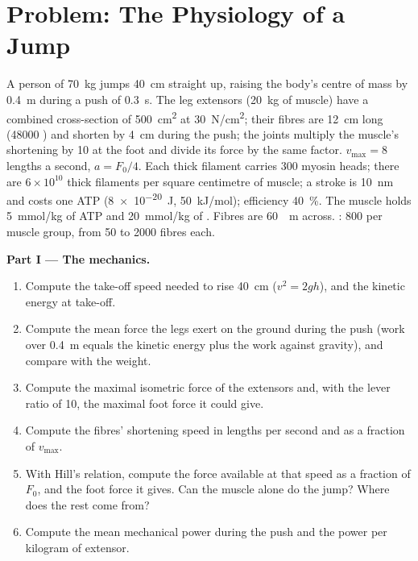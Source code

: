 \section{Problem: The Physiology of a Jump}

\begin{problem}
\label{pb:b2:muscle-movement:1}
A person of \qty{70}{kg} jumps \qty{40}{cm} straight up, raising the
body's centre of mass by \qty{0.4}{m} during a push of \qty{0.3}{s}.
The leg extensors (\qty{20}{kg} of muscle) have a combined
cross-section of \qty{500}{cm^2} at \qty{30}{N/cm^2}; their fibres
are \qty{12}{cm} long (\num{48000} ) and shorten by
\qty{4}{cm} during the push; the joints multiply the muscle's
shortening by \num{10} at the foot and divide its force by the
same factor. $v_{\max} = 8$ lengths a second, $a = F_0/4$. Each
thick filament carries \num{300} myosin heads; there are $6\times
10^{10}$ thick filaments per square centimetre of muscle; a stroke
is \qty{10}{nm} and costs one ATP (\qty{8e-20}{J}, \qty{50}{kJ/mol});
efficiency \qty{40}{\%}. The muscle holds \qty{5}{mmol/kg} of ATP and
\qty{20}{mmol/kg} of . Fibres are \qty{60}{\micro
m} across. : \num{800} per muscle group, from \num{50} to
\num{2000} fibres each.

\medskip
\noindent\textbf{Part I --- The mechanics.}
\begin{enumerate}
  \item Compute the take-off speed needed to rise \qty{40}{cm}
        ($v^{2} = 2gh$), and the kinetic energy at take-off.
  \item Compute the mean force the legs exert on the ground during
        the push (work over \qty{0.4}{m} equals the kinetic energy
        plus the work against gravity), and compare with the weight.
  \item Compute the maximal isometric force of the extensors and,
        with the lever ratio of 10, the maximal foot force it could
        give.
  \item Compute the fibres' shortening speed in lengths per second
        and as a fraction of $v_{\max}$.
  \item With Hill's relation, compute the force available at that
        speed as a fraction of $F_0$, and the foot force it gives.
        Can the muscle alone do the jump? Where does the rest come
        from?
  \item Compute the mean mechanical power during the push and the
        power per kilogram of extensor.
\end{enumerate}


\end{problem}
